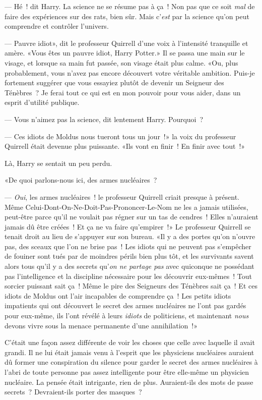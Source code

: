 --- Hé~! dit Harry. La science ne se résume pas à ça~! Non pas que ce soit \emph{mal} de faire des expériences sur des rats, bien sûr. Mais c'\emph{est} par la science qu'on peut comprendre et contrôler l'univers.

--- Pauvre idiot», dit le professeur Quirrell d'une voix à l'intensité tranquille et amère. «Vous êtes un pauvre idiot, Harry Potter.» Il se passa une main sur le visage, et lorsque sa main fut passée, son visage était plus calme. «Ou, plus probablement, vous n'avez pas encore découvert votre véritable ambition. Puis-je fortement suggérer que vous essayiez plutôt de devenir un Seigneur des Ténèbres~? Je ferai tout ce qui est en mon pouvoir pour vous aider, dans un esprit d'utilité publique.

--- Vous n'aimez pas la science, dit lentement Harry. Pourquoi~?

--- Ces idiots de Moldus nous tueront tous un jour~!» la voix du professeur Quirrell était devenue plus puissante. «Ils vont en finir~! En finir avec tout~!»

Là, Harry se sentait un peu perdu.

«De quoi parlons-nous ici, des armes nucléaires~?

--- \emph{Oui}, les armes nucléaires~! le professeur Quirrell criait presque à présent. Même Celui-Dont-On-Ne-Doit-Pas-Prononcer-Le-Nom ne les a jamais utilisées, peut-être parce qu'il ne voulait pas régner sur un tas de cendres~! Elles n'auraient jamais dû être créées~! Et ça ne va faire qu'empirer~!» Le professeur Quirrell se tenait droit au lieu de s'appuyer sur son bureau. «Il y a des portes qu'on n'ouvre pas, des sceaux que l'on ne brise pas~! Les idiots qui ne peuvent pas s'empêcher de fouiner sont tués par de moindres périls bien plus tôt, et les survivants savent alors tous qu'il y a des secrets qu'\emph{on ne partage pas} avec quiconque ne possédant pas l'intelligence et la discipline nécessaire pour les découvrir eux-mêmes~! Tout sorcier puissant sait ça~! Même le pire des Seigneurs des Ténèbres sait ça~! Et ces idiots de Moldus ont l'air incapables de comprendre ça~! Les petits idiots impatients qui ont découvert le secret des armes nucléaires ne l'ont pas gardés pour eux-même, ils l'ont révélé à leurs \emph{idiots} de politiciens, et maintenant \emph{nous} devons vivre sous la menace permanente d'une annihilation~!»

C'était une façon assez différente de voir les choses que celle avec laquelle il avait grandi. Il ne lui était jamais venu à l'esprit que les physiciens nucléaires auraient dû former une conspiration du silence pour garder le secret des armes nucléaires à l'abri de toute personne pas assez intelligente pour être elle-même un physicien nucléaire. La pensée était intrigante, rien de plus. Auraient-ils des mots de passe secrets~? Devraient-ils porter des masques~?

